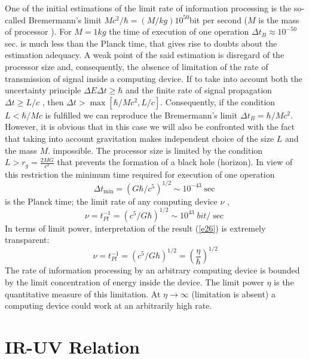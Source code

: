 \documentclass [12pt]{article}
\begin{document}
One of the initial estimations of the limit rate of information processing is the so-called  Bremermann's limit \cite{s25} $M{c^2}/\hbar  = \left( {M/kg} \right){10^{50}}$bit per second ($M$ is the mass of processor ). For  $M = 1kg$ the time of execution of one operation $\Delta {t_B} \approx {10^{ - 50}}$ sec. is much less than the Planck time, that gives rise to doubts about the estimation adequacy. A weak point of the said estimation is disregard of the processor size and, consequently, the absence of limitation of the rate of transmission of signal inside a computing device.  If to take into account \cite{s26} both the uncertainty principle $\Delta E\Delta t \ge \hbar $ and the finite rate of signal propagation $\Delta t \ge L/c$ , then $\Delta t > \max \left[ {\hbar /M{c^2},L/c} \right]$. Consequently, if the condition  $L < \hbar /Mc$ is fulfilled we can reproduce the  Bremermann's limit $\Delta {t_B} = \hbar /M{c^2}$. However, it is obvious that in this case we  will  also be confronted with the fact that taking into account gravitation makes independent choice of the size $L$ and the  mass $M$. impossible. The processor size is limited by the condition $L > {r_g} = \frac{{2MG}}{{{c^2}}}$ that prevents the formation of a black hole  (horizon). In view of this restriction the minimum time required for execution of one operation
\begin{equation}\label{e25}
  \Delta {t_{\min }} = {\left( {G\hbar /{c^5}} \right)^{1/2}} \sim {10^{ - 43}}\sec
\end{equation}
is the Planck time; the limit rate of any computing device $\nu $ ,
\begin{equation}\label{e26}
  \nu  = t_{Pl}^{ - 1} = {\left( {{c^5}/G\hbar } \right)^{1/2}} \sim {10^{43}}\;bit/\sec
\end{equation}
In terms of limit power, interpretation of the result  (\ref{e26}) is extremely transparent:
\begin{equation}\label{e27}
  \nu  = t_{Pl}^{ - 1} = {\left( {{c^5}/G\hbar } \right)^{1/2}} = {\left( {\frac{\eta }{\hbar }} \right)^{1/2}}
\end{equation}
The rate of information processing by an arbitrary computing device is bounded by the limit concentration of energy inside the device. The limit power $\eta$ is the quantitative measure of this limitation. At $\eta  \to \infty$ (limitation is absent) a computing device could  work at an arbitrarily high rate.

\section{IR-UV Relation}
\end{document}
